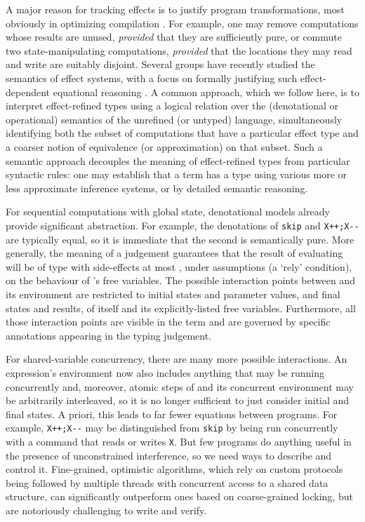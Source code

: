 \documentclass[nocopyrightspace,preprint]{sigplanconf}
\begin{document}
A major reason for
tracking effects is to justify program
transformations, most obviously in optimizing compilation \cite{DBLP:conf/icfp/BentonKR98}. For example,
one may remove computations whose results are
unused, \emph{provided} that they are sufficiently pure, or commute two
state-manipulating computations, \emph{provided} that the locations they may
read and write are suitably disjoint. Several groups 
have recently studied the semantics of effect systems, with a focus on
formally justifying such effect-dependent equational reasoning \cite{DBLP:conf/popl/KammarP12,DBLP:conf/aplas/BentonKHB06,DBLP:dblp_conf/popl/Benton0N14,birkedal,DBLP:conf/icfp/ThamsborgB11}. A common approach, which we follow here, is to
interpret effect-refined types using a
logical relation over the (denotational or operational) semantics of
the unrefined (or untyped) language, simultaneously identifying both the
subset of computations that have a particular effect type and a
coarser notion of equivalence (or approximation) on that subset. Such
a semantic approach decouples the meaning of effect-refined types from
particular syntactic rules: one may establish that a term
has a type using various more or less approximate inference systems, or
by detailed semantic reasoning. 

For sequential computations with global state,  denotational
models already provide significant
abstraction. For example, the denotations of \verb|skip| and
\verb|X++;X--| are typically equal, so it is immediate that the
second is semantically pure. More generally, 
the meaning of a
judgement  guarantees that the result of
evaluating  will be of type  with side-effects at most ,
under assumptions  (a `rely' condition), on the behaviour of
's free variables. The possible interaction points
between  and its environment are restricted to initial states and
parameter values, and final states and results, of  itself and its
explicitly-listed free variables. Furthermore, all those interaction
points are visible in the term and are governed by specific
annotations appearing in the typing judgement.

For shared-variable concurrency, there are many more possible
interactions. An expression's environment now also includes anything
that may be running concurrently and, moreover, atomic steps of 
and its concurrent environment may be arbitrarily interleaved, so it
is no longer sufficient to just consider initial and final states. A
priori, this leads to far fewer equations between programs. For
example, \verb|X++;X--| may be distinguished from \verb|skip| by being
run concurrently with a command that reads or writes \verb|X|. But few
programs do anything useful in the presence of unconstrained
interference, so we need ways to describe and control
it. 
Fine-grained, optimistic algorithms, which rely on
custom protocols being followed by multiple threads with concurrent
access to a shared data structure, can significantly
outperform ones based on coarse-grained locking, but are notoriously
challenging to write and verify.
\end{document}
